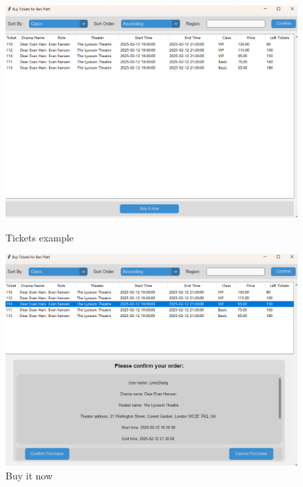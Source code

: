 \documentclass[12pt]{article}
\begin{document}
\begin{figure}[H]
    \centering
    \begin{minipage}{0.48\textwidth}
        \centering
        \includegraphics[width=\textwidth]{17.png}
        \caption{Tickets example} 
        \label{Figure 17}
    \end{minipage}
    \hfill
    \begin{minipage}{0.48\textwidth}
        \centering
        \includegraphics[width=\textwidth]{18.png}
        \caption{Buy it now}
        \label{Figure 18}
    \end{minipage}
\end{figure}
\end{document}
